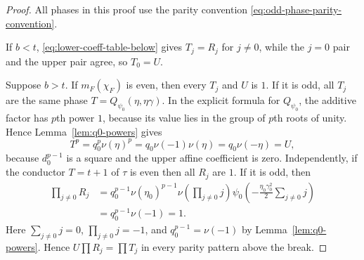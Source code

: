 \documentclass[11pt]{amsart}
\theoremstyle{definition}
\theoremstyle{remark}
\begin{document}
\begin{proof}
All phases in this proof use the parity convention
\eqref{eq:odd-phase-parity-convention}.

If $b<t$, \eqref{eq:lower-coeff-table-below} gives $T_j=R_j$ for
$j\ne0$, while the $j=0$ pair and the upper pair agree, so $T_0=U$.

Suppose $b>t$.  If $m_F(\chi_F)$ is even, then every $T_j$ and $U$ is
$1$.  If it is odd, all $T_j$ are the same phase
$T=Q_{\psi_0}(\eta,\eta\gamma)$.  In the explicit formula for
$Q_{\psi_0}$, the additive factor has $p$th power $1$, because its
value lies in the group of $p$th roots of unity.  Hence Lemma~\ref{lem:q0-powers} gives
\[
 T^p=q_0^p\nu(\eta)^p
 =q_0\nu(-1)\nu(\eta)
 =q_0\nu(-\eta)=U,
\]
because $d_0^{p-1}$ is a square and the upper affine coefficient is
zero.  Independently, if the conductor $T=t+1$ of $\tau$ is even then
all $R_j$ are $1$.  If it is odd, then
\begin{align*}
 \prod_{j\ne0}R_j
 &=q_0^{p-1}\nu(\eta_0)^{p-1}
   \nu\!\left(\prod_{j\ne0}j\right)
   \psi_0\!\left(-\frac{\eta_0\gamma_0^2}{2}
                         \sum_{j\ne0}j\right)\\
 &=q_0^{p-1}\nu(-1)=1.
\end{align*}
Here $\sum_{j\ne0}j=0$, $\prod_{j\ne0}j=-1$, and
$q_0^{p-1}=\nu(-1)$ by Lemma~\ref{lem:q0-powers}.  Hence
$U\prod R_j=\prod T_j$ in every parity
pattern above the break.


\end{proof}
\end{document}
